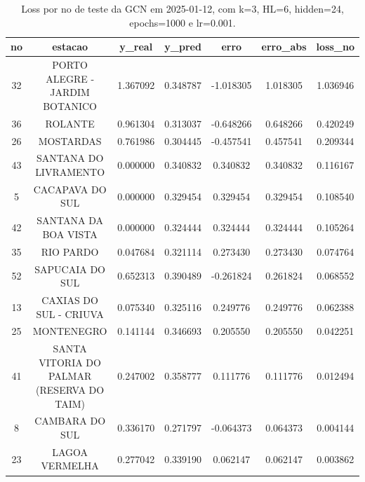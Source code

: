 \begin{table}[h]
\centering
\caption{Loss por no de teste da GCN em 2025-01-12, com k=3, HL=6, hidden=24, epochs=1000 e lr=0.001.}
\label{tab:gcn_loss_k3_hl6_h24_e1000_d20250112}
\begin{tabular}{ccccccc}
\toprule
no & estacao & y\_real & y\_pred & erro & erro\_abs & loss\_no \\
\midrule
32 & PORTO ALEGRE - JARDIM BOTANICO & 1.367092 & 0.348787 & -1.018305 & 1.018305 & 1.036946 \\
36 & ROLANTE & 0.961304 & 0.313037 & -0.648266 & 0.648266 & 0.420249 \\
26 & MOSTARDAS & 0.761986 & 0.304445 & -0.457541 & 0.457541 & 0.209344 \\
43 & SANTANA DO LIVRAMENTO & 0.000000 & 0.340832 & 0.340832 & 0.340832 & 0.116167 \\
5 & CACAPAVA DO SUL & 0.000000 & 0.329454 & 0.329454 & 0.329454 & 0.108540 \\
42 & SANTANA DA BOA VISTA & 0.000000 & 0.324444 & 0.324444 & 0.324444 & 0.105264 \\
35 & RIO PARDO & 0.047684 & 0.321114 & 0.273430 & 0.273430 & 0.074764 \\
52 & SAPUCAIA DO SUL & 0.652313 & 0.390489 & -0.261824 & 0.261824 & 0.068552 \\
13 & CAXIAS DO SUL - CRIUVA & 0.075340 & 0.325116 & 0.249776 & 0.249776 & 0.062388 \\
25 & MONTENEGRO & 0.141144 & 0.346693 & 0.205550 & 0.205550 & 0.042251 \\
41 & SANTA VITORIA DO PALMAR (RESERVA DO TAIM) & 0.247002 & 0.358777 & 0.111776 & 0.111776 & 0.012494 \\
8 & CAMBARA DO SUL & 0.336170 & 0.271797 & -0.064373 & 0.064373 & 0.004144 \\
23 & LAGOA VERMELHA & 0.277042 & 0.339190 & 0.062147 & 0.062147 & 0.003862 \\
\bottomrule
\end{tabular}
\end{table}
